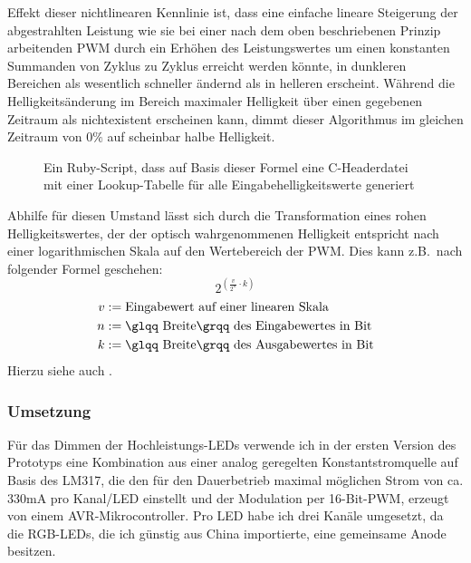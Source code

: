 \documentclass[12pt,a4paper,notitlepage]{article}
\begin{document}
Effekt dieser nichtlinearen Kennlinie ist, dass eine einfache lineare Steigerung der abgestrahlten Leistung wie sie bei einer nach dem oben beschriebenen Prinzip arbeitenden \gls{PWM} durch ein Erhöhen des Leistungswertes um einen konstanten Summanden von Zyklus zu Zyklus erreicht werden könnte, in dunkleren Bereichen als wesentlich schneller ändernd als in helleren erscheint. Während die Helligkeitsänderung im Bereich maximaler Helligkeit über einen gegebenen Zeitraum als nichtexistent erscheinen kann, dimmt dieser Algorithmus im gleichen Zeitraum von $0\%$ auf scheinbar halbe Helligkeit.

\begin{figure}

\caption{Ein Ruby-Script, dass auf Basis dieser Formel eine C-Headerdatei mit einer Lookup-Tabelle für alle Eingabehelligkeitswerte generiert}
\end{figure}

Abhilfe für diesen Umstand lässt sich durch die Transformation eines rohen Helligkeitswertes, der der optisch wahrgenommenen Helligkeit entspricht nach einer logarithmischen Skala auf den Wertebereich der \gls{PWM}. Dies kann z.B.\ nach folgender Formel geschehen:
\begin{equation}
2^{\left(\frac{v}{2^n}\cdot k\right)}
\end{equation}
\begin{align}
v&:=\text{Eingabewert auf einer linearen Skala}\\
n&:=\text{\glqq Breite\grqq\ des Eingabewertes in Bit}\\
k&:=\text{\glqq Breite\grqq\  des Ausgabewertes in Bit}
\end{align}
Hierzu siehe auch \cite{MAXIM41,MAXIM57,SIART1}.

\subsubsection{Umsetzung}
Für das Dimmen der Hochleistungs-LEDs verwende ich in der ersten Version des Prototyps eine Kombination aus einer analog geregelten Konstantstromquelle auf Basis des LM317\cite{NATIONAL3}, die den für den Dauerbetrieb maximal möglichen Strom von ca. 330mA pro Kanal/LED einstellt und der Modulation per 16-Bit-PWM, erzeugt von einem AVR-Mikrocontroller.
Pro LED habe ich drei Kanäle umgesetzt, da die RGB-LEDs, die ich günstig aus China importierte,%
eine gemeinsame Anode besitzen.
\end{document}
